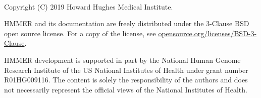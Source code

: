 \newpage
\begin{fullwidth}
  ~\vfill
  \thispagestyle{empty}
  \setlength{\parindent}{0pt}
  \setlength{\parskip}{\baselineskip}

\par
Copyright (C) 2019 Howard Hughes Medical Institute.

\par
HMMER and its documentation are freely distributed
under the 3-Clause BSD open source license. For a copy of the license,
see \href{https://opensource.org/licenses/BSD-3-Clause}{opensource.org/licenses/BSD-3-Clause}.

\par
HMMER development is supported in part by the National Human
Genome Research Institute of the US National Institutes of Health under
grant number R01HG009116. The content is solely the responsibility
of the authors and does not necessarily represent the official views of
the National Institutes of Health.

\end{fullwidth}




